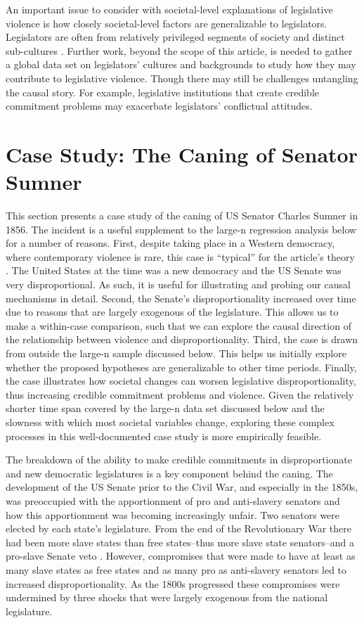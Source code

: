 \documentclass[a4paper]{article}\usepackage[]{graphicx}\usepackage[]{color}
\begin{document}
An important issue to consider with societal-level explanations of legislative violence is how closely societal-level factors are generalizable to legislators. Legislators are often from relatively privileged segments of society and distinct sub-cultures \citep[408]{Spary2013}. Further work, beyond the scope of this article, is needed to gather a global data set on legislators' cultures and backgrounds to study how they may contribute to legislative violence. Though there may still be challenges untangling the causal story. For example, legislative institutions that create credible commitment problems may exacerbate legislators' conflictual attitudes.

\section*{Case Study: The Caning of Senator Sumner}

This section presents a case study of the caning of US Senator Charles Sumner in 1856. The incident is a useful supplement to the large-n regression analysis below for a number of reasons. First, despite taking place in a Western democracy, where contemporary violence is rare, this case is ``typical'' for the article's theory \citep[299]{Seawright2008}. The United States at the time was a new democracy and the US Senate was very disproportional. As such, it is useful for illustrating and probing our causal mechanisms in detail. Second, the Senate's disproportionality increased over time due to reasons that are largely exogenous of the legislature. This allows us to make a within-case comparison, such that we can explore the causal direction of the relationship between violence and disproportionality. Third, the case is drawn from outside the large-n sample discussed below. This helps us initially explore whether the proposed hypotheses are generalizable to other time periods. Finally, the case illustrates how societal changes can worsen legislative disproportionality, thus increasing credible commitment problems and violence. Given the relatively shorter time span covered by the large-n data set discussed below and the slowness with which most societal variables change, exploring these complex processes in this well-documented case study is more empirically feasible.

The breakdown of the ability to make credible commitments in disproportionate and new democratic legislatures is a key component behind the caning. The development of the US Senate prior to the Civil War, and especially in the 1850s, was preoccupied with the apportionment of pro and anti-slavery senators and how this apportionment was becoming increasingly unfair. Two senators were elected by each state's legislature. From the end of the Revolutionary War there had been more slave states than free states--thus more slave state senators--and a pro-slave Senate veto \cite[151]{Weingast1998}. However, compromises that were made to have at least as many slave states as free states and as many pro as anti-slavery senators led to increased disproportionality. As the 1800s progressed these compromises were undermined by three shocks that were largely exogenous from the national legislature.
\end{document}
